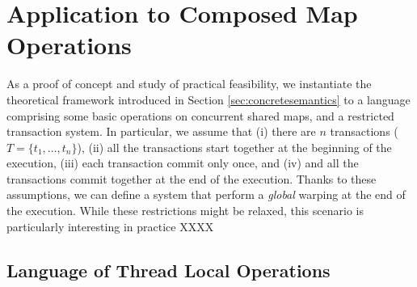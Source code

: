 \newcommand{\set}[1]{\mathsf{#1}}
\newcommand{\isSummary}{\set{summary}}
\newcommand{\freshNode}{\set{fresh}}
\newcommand{\heapnode}{\set{HeapNode}}
\newcommand{\variable}{\set{Var}}
\newcommand{\env}{\set{Env}}
\newcommand{\map}{\set{Map}}
\newcommand{\state}{\set{\Sigma}}
\newcommand{\serializedCFGs}{\set{serializedCFGs}}
\newcommand{\iseqclass}{\set{eqClass}}
\newcommand{\warpdestination}{\set{warpDest}}

\section{Application to Composed Map Operations}
\label{se:instance}
As a proof of concept and study of practical feasibility, we instantiate the theoretical framework introduced in Section \ref{sec:concretesemantics} to a language comprising some basic operations on concurrent shared maps, and a restricted transaction system. In particular, we assume that (i) there are $n$ transactions ($T=\{t_1, ..., t_n\}$), (ii) all the transactions start together at the beginning of the execution, (iii) each transaction commit only once, and (iv) and all the transactions commit together at the end of the execution. Thanks to these assumptions, we can define a system that perform a \emph{global} warping at the end of the execution. While these restrictions might be relaxed, this scenario is particularly interesting in practice XXXX


\subsection{Language of Thread Local Operations}
\label{sect:language}

